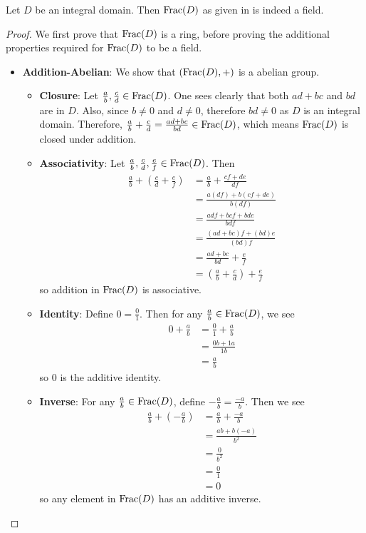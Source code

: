 \begin{proposition}
    Let $D$ be an integral domain. Then $\mathrm{Frac}(D)$ as given in  is indeed a field.
\end{proposition}
\begin{proof}
    We first prove that $\mathrm{Frac}(D)$ is a ring, before proving the additional properties required for $\mathrm{Frac}(D)$ to be a field.
    \begin{itemize}
        \item \textbf{Addition-Abelian}: We show that $(\mathrm{Frac}(D), +)$ is a abelian group.
        \begin{itemize}
            \item \textbf{Closure}: Let $\frac ab, \frac cd \in \mathrm{Frac}(D)$. One sees clearly that both $ad + bc$ and $bd$ are in $D$. Also, since $b \neq 0$ and $d \neq 0$, therefore $bd \neq 0$ as $D$ is an integral domain. Therefore, $\frac ab + \frac cd = \frac{ad + bc}{bd} \in \mathrm{Frac}(D)$, which means $\mathrm{Frac}(D)$ is closed under addition.

            \item \textbf{Associativity}: Let $\frac ab, \frac cd, \frac ef \in \mathrm{Frac}(D)$. Then
            \begin{align*}
                \frac ab + \left(\frac cd + \frac ef\right) &= \frac ab + \frac {cf + de}{df}\\
                &= \frac{a(df) + b(cf + de)}{b(df)}\\
                &= \frac{adf + bcf + bde}{bdf}\\
                &= \frac{(ad + bc)f + (bd)e}{(bd)f}\\
                &= \frac{ad+bc}{bd} + \frac ef\\
                &= \left(\frac ab + \frac cd\right) + \frac ef
            \end{align*}
            so addition in $\mathrm{Frac}(D)$ is associative.

            \item \textbf{Identity}: Define $0 = \frac 01$. Then for any $\frac ab \in \mathrm{Frac}(D)$, we see
            \begin{align*}
                0 + \frac ab &= \frac 01 + \frac ab\\
                &= \frac{0b + 1a}{1b}\\
                &= \frac ab
            \end{align*}
            so 0 is the additive identity.

            \item \textbf{Inverse}: For any $\frac ab \in \mathrm{Frac}(D)$, define $-\frac ab = \frac{-a}b$. Then we see
            \begin{align*}
                \frac ab + \left(-\frac ab\right) &= \frac ab + \frac{-a}b\\
                &= \frac{ab + b(-a)}{b^2}\\
                &= \frac 0{b^2}\\
                &= \frac 01\\
                &= 0
            \end{align*}
            so any element in $\mathrm{Frac}(D)$ has an additive inverse.


\end{itemize}
\end{itemize}
\end{proof}
